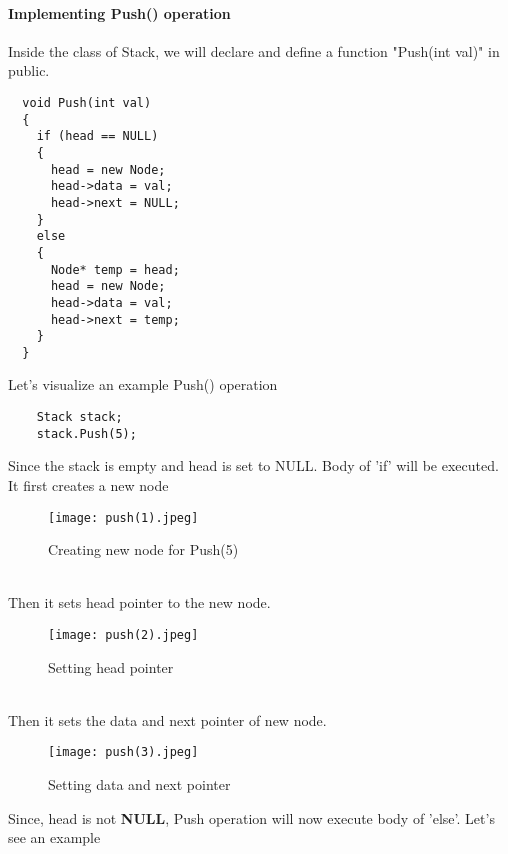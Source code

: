 \documentclass[11pt,fleqn]{book} %
\begin{document}
\paragraph{Implementing Push() operation}
Inside the class of Stack, we will declare and define a function "Push(int val)" in public.
\begin{lstlisting}
  void Push(int val)
  {
    if (head == NULL)
    {
      head = new Node;
      head->data = val;
      head->next = NULL;
    }
    else
    {
      Node* temp = head;
      head = new Node;
      head->data = val;
      head->next = temp;
    }
  }
\end{lstlisting}
\newpage
\begin{example}
  Let's visualize an example Push() operation\\
  \begin{lstlisting}
    Stack stack;
    stack.Push(5);
  \end{lstlisting}
  Since the stack is empty and head is set to NULL. Body of 'if' will be executed.\\
  It first creates a new node\\
  \begin{figure}[H]
    \centering
    \texttt{[image: push(1).jpeg]}
    \caption{Creating new node for Push(5)}
  \end{figure}
  ~\\
  Then it sets head pointer to the new node.
  \begin{figure}[H]
    \centering
    \texttt{[image: push(2).jpeg]}
    \caption{Setting head pointer}
  \end{figure}
  ~\\
  Then it sets the data and next pointer of new node.
  \begin{figure}[H]
    \centering
    \texttt{[image: push(3).jpeg]}
    \caption{Setting data and next pointer}
  \end{figure}
\end{example}
\newpage
Since, head is not \textbf{NULL}, Push operation will now execute body of 'else'. Let's see an example
\end{document}
